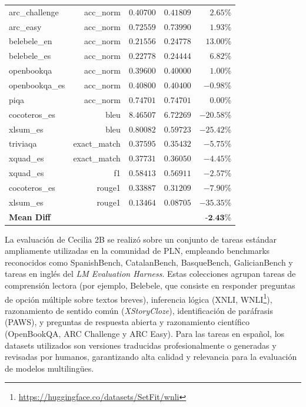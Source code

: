 \documentclass[10pt,twoside]{rcmart} %
\begin{document}
\begin{table}[hbt]
\begin{center}
\begin{tabular}{lrrrr}
arc\_challenge      & acc\_norm     & $0.40700$   & $0.41809$  & $2.65$\%    		 \\
arc\_easy           & acc\_norm     & $0.72559$   & $0.73990$  & $1.93$\%    		 \\
belebele\_en        & acc\_norm     & $0.21556$   & $0.24778$  & $13.00$\%   		 \\
belebele\_es        & acc\_norm     & $0.22778$   & $0.24444$  & $6.82$\%    		 \\
openbookqa          & acc\_norm     & $0.39600$   & $0.40000$  & $1.00$\%    		 \\
openbookqa\_es      & acc\_norm     & $0.40800$   & $0.40400$  & $-0.98$\%   		 \\
piqa                & acc\_norm     & $0.74701$   & $0.74701$  & $0.00$\%    		 \\
cocoteros\_es       & bleu          & $8.46507$   & $6.72269$  & $-20.58$\%  		 \\
xlsum\_es           & bleu          & $0.80082$   & $0.59723$  & $-25.42$\%  		 \\
triviaqa            & exact\_match  & $0.37595$   & $0.35432$  & $-5.75$\%   		 \\
xquad\_es           & exact\_match  & $0.37731$   & $0.36050$  & $-4.45$\%   		 \\
xquad\_es           & f1            & $0.58413$   & $0.56911$  & $-2.57$\%   		 \\
cocoteros\_es       & rouge1        & $0.33887$   & $0.31209$  & $-7.90$\%   		 \\
xlsum\_es           & rouge1        & $0.13464$   & $0.08705$  & $-35.35$\%  		 \\
\textbf{Mean Diff}  &               &             &            & $\textbf{-2.43}$\%  \\\hline\hline
\end{tabular}
\end{center}
\label{tab:eval}
\end{table}

La evaluación de Cecilia 2B se realizó sobre un conjunto de tareas estándar ampliamente utilizadas en la comunidad de PLN, empleando benchmarks reconocidos como SpanishBench, CatalanBench, BasqueBench, GalicianBench y tareas en inglés del \textit{LM Evaluation Harness}\cite{biderman2024lessons}. Estas colecciones agrupan tareas de comprensión lectora (por ejemplo, Belebele\cite{bandarkar2023belebele}, que consiste en responder preguntas de opción múltiple sobre textos breves), inferencia lógica (XNLI\cite{conneau2018xnli}, WNLI\footnote{\url{https://huggingface.co/datasets/SetFit/wnli}}), razonamiento de sentido común (\textit{XStoryCloze}\cite{lin2022few}), identificación de paráfrasis (PAWS\cite{jayawardena2024parafusion}), y preguntas de respuesta abierta y razonamiento científico (OpenBookQA\cite{mihaylov2018can}, ARC Challenge y ARC Easy\cite{clark2018think}). Para las tareas en español, los datasets utilizados son versiones traducidas profesionalmente o generadas y revisadas por humanos, garantizando alta calidad y relevancia para la evaluación de modelos multilingües.
\end{document}
